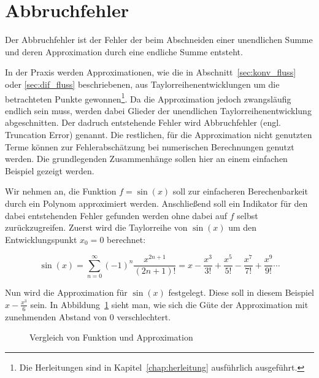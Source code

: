 \section{Abbruchfehler}

Der Abbruchfehler ist der Fehler der beim Abschneiden einer unendlichen Summe
und deren Approximation durch eine endliche Summe entsteht.

In der Praxis werden Approximationen, wie die in Abschnitt~\ref{sec:konv_fluss} oder
\ref{sec:dif_fluss} beschriebenen, aus Taylorreihenentwicklungen um die betrachteten
Punkte gewonnen\footnote{Die Herleitungen sind in Kapitel~\ref{chap:herleitung} ausführlich ausgeführt.}. 
Da die Approximation jedoch zwangsläufig endlich sein muss, werden
dabei Glieder der unendlichen Taylorreihenentwicklung abgeschnitten. Der dadruch entstehende
Fehler wird Abbruchfehler (engl. Truncation Error) genannt.
Die restlichen, für die Approximation nicht genutzten Terme können zur Fehlerabschätzung
bei numerischen Berechnungen genutzt werden. Die grundlegenden Zusammenhänge sollen hier an einem einfachen Beispiel gezeigt werden.

Wir nehmen an, die Funktion $f=\sin(x)$ soll zur einfacheren Berechenbarkeit durch
ein Polynom approximiert werden. Anschließend soll ein Indikator für den dabei
entstehenden Fehler gefunden werden ohne dabei auf $f$
selbst zurückzugreifen.
Zuerst wird die Taylorreihe von $\sin(x)$ um den Entwicklungspunkt $x_0 =0$ berechnet:

\begin{equation}
  \sin(x) = \sum_{n=0}^{\infty}(-1)^n \frac{x^{2n+1}}{(2n+1)!} = 
  x-\frac{x^3}{3!} +\frac{x^5}{5!} -\frac{x^7}{7!} +\frac{x^9}{9!}\cdots
 \label{eq:taylor_example}
\end{equation}

Nun wird die Approximation für $\sin(x)$ festgelegt. Diese soll in diesem Beispiel
$x-\frac{x^3}{6} $ sein. In Abbildung~\ref{fig:taylor_example} sieht man, wie sich die Güte der
Approximation mit zunehmenden Abstand von $0$ verschlechtert.

\begin{figure}[h]
\centering
\caption{Vergleich von Funktion und Approximation}
 \label{fig:taylor_example}
\end{figure}

